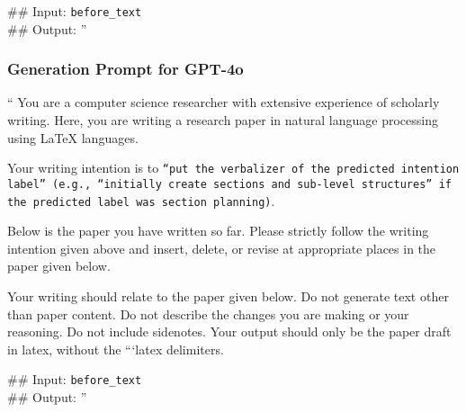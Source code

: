 \#\# Input: \texttt{{before\_text}} \\
\#\# Output: 
''

\subsubsection{Generation Prompt for GPT-4o}

``
You are a computer science researcher with extensive experience of scholarly writing. Here, you are writing a research paper in natural language processing using LaTeX languages.

Your writing intention is to \texttt{{``put the verbalizer of the predicted intention label''} (e.g., ``initially create sections and sub-level structures'' if the predicted label was section planning)}. 

Below is the paper you have written so far. Please strictly follow the writing intention given above and insert, delete, or revise at appropriate places in the paper given below.

Your writing should relate to the paper given below. Do not generate text other than paper content. Do not describe the changes you are making or your reasoning. Do not include sidenotes. Your output should only be the paper draft in latex, without the ```latex delimiters.

\#\# Input: \texttt{{before\_text}} \\
\#\# Output: 
''







